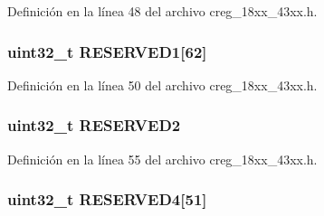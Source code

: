 Definición en la línea 48 del archivo creg\+\_\+18xx\+\_\+43xx.\+h.

\subsubsection[{\texorpdfstring{R\+E\+S\+E\+R\+V\+E\+D1}{RESERVED1}}]{ uint32\+\_\+t R\+E\+S\+E\+R\+V\+E\+D1\mbox{[}62\mbox{]}}\hypertarget{struct_l_p_c___c_r_e_g___t_a083abb7cb5e268b721ad9da5e9533593}{}\label{struct_l_p_c___c_r_e_g___t_a083abb7cb5e268b721ad9da5e9533593}


Definición en la línea 50 del archivo creg\+\_\+18xx\+\_\+43xx.\+h.

\subsubsection[{\texorpdfstring{R\+E\+S\+E\+R\+V\+E\+D2}{RESERVED2}}]{ uint32\+\_\+t R\+E\+S\+E\+R\+V\+E\+D2}\hypertarget{struct_l_p_c___c_r_e_g___t_a13d8c36a296a876371d8e463cfce0bc5}{}\label{struct_l_p_c___c_r_e_g___t_a13d8c36a296a876371d8e463cfce0bc5}


Definición en la línea 55 del archivo creg\+\_\+18xx\+\_\+43xx.\+h.

\subsubsection[{\texorpdfstring{R\+E\+S\+E\+R\+V\+E\+D4}{RESERVED4}}]{ uint32\+\_\+t R\+E\+S\+E\+R\+V\+E\+D4\mbox{[}51\mbox{]}}\hypertarget{struct_l_p_c___c_r_e_g___t_a58831dcf6b6b26003b4f0235d8b66e79}{}\label{struct_l_p_c___c_r_e_g___t_a58831dcf6b6b26003b4f0235d8b66e79}


